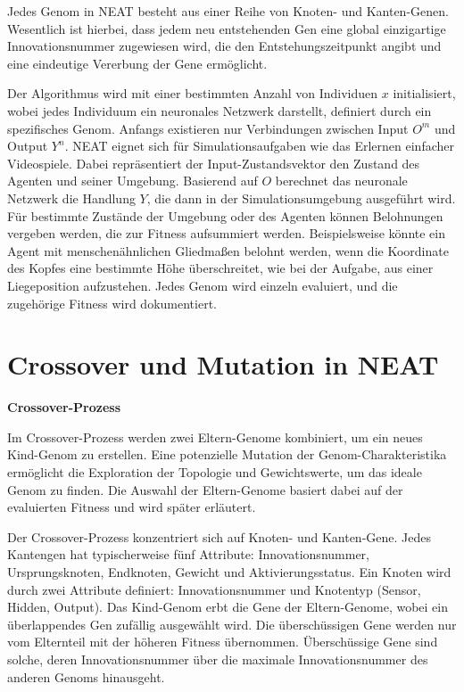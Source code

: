 Jedes Genom in NEAT besteht aus einer Reihe von Knoten- und Kanten-Genen. Wesentlich ist hierbei, dass jedem neu entstehenden Gen eine global einzigartige Innovationsnummer zugewiesen wird, die den Entstehungszeitpunkt angibt und eine eindeutige Vererbung der Gene ermöglicht.

Der Algorithmus wird mit einer bestimmten Anzahl von Individuen $x$ initialisiert, wobei jedes Individuum ein neuronales Netzwerk darstellt, definiert durch ein spezifisches Genom. Anfangs existieren nur Verbindungen zwischen Input $O^m$ und Output $Y^n$. NEAT eignet sich für Simulationsaufgaben wie das Erlernen einfacher Videospiele. Dabei repräsentiert der Input-Zustandsvektor den Zustand des Agenten und seiner Umgebung. Basierend auf $O$ berechnet das neuronale Netzwerk die Handlung $Y$, die dann in der Simulationsumgebung ausgeführt wird. Für bestimmte Zustände der Umgebung oder des Agenten können Belohnungen vergeben werden, die zur Fitness aufsummiert werden. Beispielsweise könnte ein Agent mit menschenähnlichen Gliedmaßen belohnt werden, wenn die Koordinate des Kopfes eine bestimmte Höhe überschreitet, wie bei der Aufgabe, aus einer Liegeposition aufzustehen. Jedes Genom wird einzeln evaluiert, und die zugehörige Fitness wird dokumentiert.

\section{Crossover und Mutation in NEAT}

\textbf{Crossover-Prozess}

Im Crossover-Prozess werden zwei Eltern-Genome kombiniert, um ein neues Kind-Genom zu erstellen. Eine potenzielle Mutation der Genom-Charakteristika ermöglicht die Exploration der Topologie und Gewichtswerte, um das ideale Genom zu finden. Die Auswahl der Eltern-Genome basiert dabei auf der evaluierten Fitness und wird später erläutert.

Der Crossover-Prozess konzentriert sich auf Knoten- und Kanten-Gene. Jedes Kantengen hat typischerweise fünf Attribute: Innovationsnummer, Ursprungsknoten, Endknoten, Gewicht und Aktivierungsstatus. Ein Knoten wird durch zwei Attribute definiert: Innovationsnummer und Knotentyp (Sensor, Hidden, Output). Das Kind-Genom erbt die Gene der Eltern-Genome, wobei ein überlappendes Gen zufällig ausgewählt wird. Die überschüssigen Gene werden nur vom Elternteil mit der höheren Fitness übernommen. Überschüssige Gene sind solche, deren Innovationsnummer über die maximale Innovationsnummer des anderen Genoms hinausgeht.

